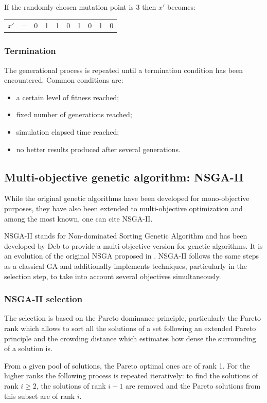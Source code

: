 \noindent
If the randomly-chosen mutation point is 3 then $x'$ becomes:
\begin{table}[h!]
\begin{center}
\begin{tabular}{cccc|c|ccccc}
\cline{5-5}
$x'$ & = & 0 & 1 & 1 & 0 & 1 & 0 & 1 & 0\\
\cline{5-5}
\end{tabular}
\end{center}
\end{table}

\subsubsection{Termination}
The generational process is repeated until a termination condition has been encountered. Common conditions are:
\begin{itemize}
\item a certain level of fitness reached;
\item fixed number of generations reached;
\item simulation elapsed time reached;
\item no better results produced after several generations.
\end{itemize}

\subsection{Multi-objective genetic algorithm: NSGA-II}
While the original genetic algorithms have been developed for mono-objective purposes, they have also been extended to multi-objective optimization and among the most known, one can cite NSGA-II.

NSGA-II stands for Non-dominated Sorting Genetic Algorithm and has been developed by Deb \cite{Deb00afast} to provide a multi-objective version for genetic algorithms. It is an evolution of the original NSGA proposed in \cite{Srinivas94multiobjectiveoptimization}. NSGA-II follows the same steps as a classical GA and additionally implements techniques, particularly in the selection step, to take into account several objectives simultaneously.

\subsubsection{NSGA-II selection}
The selection is based on the Pareto dominance principle, particularly the Pareto rank which allows to sort all the solutions of a set following an extended Pareto principle and the crowding distance which estimates how dense the surrounding of a solution is.
\begin{definition}
From a given pool of solutions, the Pareto optimal ones are of rank 1. For the higher ranks the following process is repeated iteratively: to find the solutions of rank $i \geq 2$, the solutions of rank $i-1$ are removed and the Pareto solutions from this subset are of rank $i$.
\end{definition}


